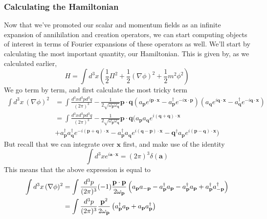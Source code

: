 \subsubsection{Calculating the Hamiltonian} 
Now that we've promoted our scalar and momentum fields as an infinite expansion of annihilation and creation operators, we can start computing objects of interest in terms of Fourier expansions of these operators as well. We'll start by calculating the most important quantity, our Hamiltonian. This is given by, as we calculated earlier, 
\[ H  = \int d^3 x \left( \frac{1}{2} \Pi^2 + \frac{1}{2} \left( \nabla \phi \right)^2 + \frac{1}{2}m^2 \phi^2  \right) \] 
We go term by term, and first calculate the most tricky term
\begin{align*} 
\int d^3 x \, (\nabla \phi)^2 &= \int \frac{d^3 x d^3 p d^3 q}{(2 \pi )^3 } - \frac{1}{2\sqrt{\omega_\mathbf{p} \omega_\mathbf{q}}} \mathbf{p} \cdot\mathbf{q} \left( a_\mathbf{p} e^{i \mathbf{p} \cdot \mathbf{x}} - a_\mathbf{p}^\dagger e^{-  i \mathbf{x} \cdot \mathbf{p}} \right)\left(a_\mathbf{q}e^{i \mathbf{q} \cdot \mathbf{x}} - a_\mathbf{q}^\dagger e^{ - i \mathbf{q} \cdot \mathbf{x}}\right) \\
& = \int \frac{d^3 x d^3 p d^3 q}{(2 \pi )^3 } - \frac{1}{2\sqrt{\omega_\mathbf{p} \omega_\mathbf{q}}} \mathbf{p} \cdot \mathbf{q} (a_\mathbf{p} a_\mathbf{q} e^{i (\mathbf{q} + \mathbf{q}) \cdot \mathbf{x}} \\
& + a_\mathbf{p}^\dagger a_\mathbf{q}^\dagger e^{ - i (\mathbf{p} + \mathbf{q}) \cdot \mathbf{x}}  - a_\mathbf{p}^\dagger a_\mathbf{q}e^{i ( \mathbf{q} - \mathbf{p}) \cdot \mathbf{x}} - \mathbf{q}^\dagger a_\mathbf{p}e^{i (\mathbf{p} - \mathbf{q}) \cdot \mathbf{x}} ) 
\end{align*} But recall that we can integrate over $\mathbf{x}$ first, and make use of the identity 
\[
\int d^3x e^{i \mathbf{a} \cdot \mathbf{x}} = (2 \pi )^3 \delta ( \mathbf{a})
\]
This means that the above expression is equal to 
\begin{align*}
\int d^3 x \, (\nabla \phi)^2&= \int \frac{d^3 p}{(2 \pi )^3} ( - 1) \frac{\mathbf{p} \cdot \mathbf{p}}{2 \omega_\mathbf{p}} \left( a_\mathbf{p} a_{ - \mathbf{p}}  - a_\mathbf{p}^\dagger a_{\mathbf{p}}  - a_{\mathbf{p}}^\dagger a_\mathbf{p} + a_\mathbf{p}^\dagger a_{ - \mathbf{p}}^\dagger \right) \\
&= \int \frac{d^3 p}{(2 \pi)^3 } \frac{ \mathbf{p}^2}{ 2 \omega_\mathbf{  p } }  \left( a_{\mathbf{p}}^\dagger a_{\mathbf{p}} + a_\mathbf{p} a_\mathbf{p}^\dagger \right)
\end{align*}

